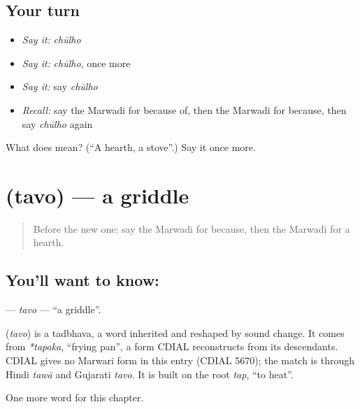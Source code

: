 \subsection*{Your turn}
\begin{itemize}
\raggedright
  \item \emph{Say it:} \emph{chūlho}
  \item \emph{Say it:} \emph{chūlho}, once more
  \item \emph{Say it:} say \emph{chūlho}
  \item \emph{Recall:} say the Marwadi for because of, then the Marwadi for because, then say \emph{chūlho} again
\end{itemize}

\begin{tcolorbox}[breakable,colback=teal!4,colframe=teal!35!black,title={Before you move on}]
What does  mean? (\textquotedblleft{}A hearth, a stove\textquotedblright{}.) Say it once more.
\end{tcolorbox}
\section[\texorpdfstring{\mw{तवो} (tavo)}{तवो (tavo)}]{ (tavo) — a griddle}

\label{lesson:MW-C118-tavo}



\begin{quote}
Before the new one: say the Marwadi for because, then the Marwadi for a hearth.
\end{quote}

\subsection*{You'll want to know: }
\textbf{} — \emph{tavo} — \textquotedblleft{}a griddle\textquotedblright{}.

\begin{cousinweb}
\textbf{} (\emph{tavo}) is a tadbhava, a word inherited and reshaped by sound change. It comes from \emph{*tapaka}, \textquotedblleft{}frying pan\textquotedblright{}, a form CDIAL reconstructs from its descendants. CDIAL gives no Marwari form in this entry (CDIAL 5670); the match is through Hindi \emph{tawā} and Gujarati \emph{tavo}. It is built on the root \emph{tap}, \textquotedblleft{}to heat\textquotedblright{}.
\end{cousinweb}

\begin{grammarlens}[title={What you've built}]
One more word for this chapter.
\end{grammarlens}

